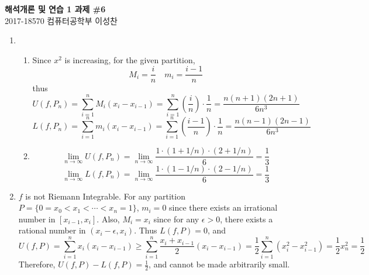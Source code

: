 \documentclass[11pt]{report}
\newcommand{\ra}{\rightarrow}
\begin{document}
\begin{center}
\textbf{\Large 해석개론 및 연습 1 과제 \#6}\\
\large 2017-18570 컴퓨터공학부 이성찬
\end{center}
\begin{enumerate}
\item 
\begin{enumerate}
	\item Since $x^2$ is increasing, for the given partition,
	$$M_i = \frac{i}{n} \quad m_i = \frac{i-1}{n}$$
	thus 
	$$U(f, P_n) = \sum_{i=1}^{n} M_i (x_i-x_{i-1}) = \sum_{i=1}^n \left(\frac{i}{n}\right) \cdot \frac{1}{n} = \frac{n(n+1)(2n+1)}{6n^3}$$
	$$L(f, P_n) = \sum_{i=1}^{n} m_i (x_i-x_{i-1}) = \sum_{i=1}^n \left(\frac{i-1}{n}\right) \cdot \frac{1}{n} = \frac{n(n-1)(2n-1)}{6n^3}$$
	\item $$\lim_{n\ra\infty} U(f, P_n) = \lim_{n\ra\infty} \frac{1\cdot (1 + 1/n) \cdot (2 + 1/n)}{6} = \frac{1}{3}$$
	$$\lim_{n\ra\infty} L(f, P_n) = \lim_{n\ra\infty} \frac{1\cdot (1 - 1/n) \cdot (2 - 1/n)}{6} = \frac{1}{3}$$
\end{enumerate}

\item $f$ is not Riemann Integrable. For any partition $P = \{0 = x_0 < x_1 < \cdots <x_n = 1\}$,
$m_i = 0$ since there exists an irrational number in $[x_{i-1}, x_i]$. Also, $M_i=x_i$ since for any $\epsilon>0$, there exists a rational number in $(x_i-\epsilon, x_i)$. Thus $L(f, P) = 0$, and $$U(f, P) = \sum_{i=1}^n x_i(x_i-x_{i-1}) \geq \sum_{i=1}^n \frac{x_{i}+x_{i-1}}{2}(x_i-x_{i-1}) = \frac{1}{2} \sum_{i=1}^n (x_i^2 - x_{i-1}^2) = \frac{1}{2}x_n^2 = \frac{1}{2}$$
Therefore, $U(f, P) - L(f, P) = \frac{1}{2}$, and cannot be made arbitrarily small.


\end{enumerate}
\end{document}
